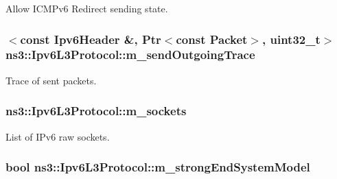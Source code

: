 Allow I\+C\+M\+Pv6 Redirect sending state. 

\subsubsection[{\texorpdfstring{m\+\_\+send\+Outgoing\+Trace}{m_sendOutgoingTrace}}]{$<$const {\bf Ipv6\+Header} \&, {\bf Ptr}$<$const {\bf Packet}$>$, uint32\+\_\+t$>$ ns3\+::\+Ipv6\+L3\+Protocol\+::m\+\_\+send\+Outgoing\+Trace\hspace{0.3cm}{\ttfamily [private]}}\hypertarget{classns3_1_1Ipv6L3Protocol_aac1ff242aa91275202e37cf7d805eec8}{}\label{classns3_1_1Ipv6L3Protocol_aac1ff242aa91275202e37cf7d805eec8}


Trace of sent packets. 

\subsubsection[{\texorpdfstring{m\+\_\+sockets}{m_sockets}}]{ ns3\+::\+Ipv6\+L3\+Protocol\+::m\+\_\+sockets\hspace{0.3cm}{\ttfamily [private]}}\hypertarget{classns3_1_1Ipv6L3Protocol_a515e9cba13d7fd95e5613f5c95ccc7b5}{}\label{classns3_1_1Ipv6L3Protocol_a515e9cba13d7fd95e5613f5c95ccc7b5}


List of I\+Pv6 raw sockets. 

\subsubsection[{\texorpdfstring{m\+\_\+strong\+End\+System\+Model}{m_strongEndSystemModel}}]{\setlength{\rightskip}{0pt plus 5cm}bool ns3\+::\+Ipv6\+L3\+Protocol\+::m\+\_\+strong\+End\+System\+Model\hspace{0.3cm}{\ttfamily [private]}}\hypertarget{classns3_1_1Ipv6L3Protocol_ac00aee071bc7ab2096efbf8fdc5e3814}{}\label{classns3_1_1Ipv6L3Protocol_ac00aee071bc7ab2096efbf8fdc5e3814}


